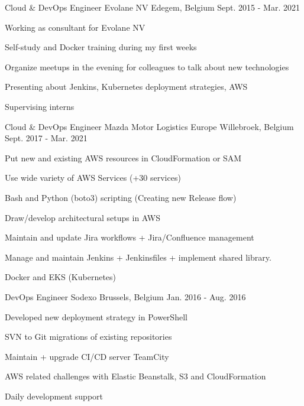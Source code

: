 \begin{cventries}
  \cventry
    {Cloud \& DevOps Engineer} %
    {Evolane NV} %
    {Edegem, Belgium} %
    {Sept. 2015 - Mar. 2021} %
    {
      \begin{cvitems} %
        \item {Working as consultant for Evolane NV}
        \item {Self-study and Docker training during my first weeks}
        \item {Organize meetups in the evening for colleagues to talk about new technologies}
        \item {Presenting about Jenkins, Kubernetes deployment strategies, AWS}
        \item {Supervising interns}
      \end{cvitems}
    }

  \cventry
    {Cloud \& DevOps Engineer} %
    {Mazda Motor Logistics Europe} %
    {Willebroek, Belgium} %
    {Sept. 2017 - Mar. 2021} %
    {
      \begin{cvitems} %
        \item {Put new and existing AWS resources in CloudFormation or SAM}
        \item {Use wide variety of AWS Services (+30 services)}
        \item {Bash and Python (boto3) scripting (Creating new Release flow)}
        \item {Draw/develop architectural setups in AWS}
        \item {Maintain and update Jira workflows + Jira/Confluence management}
        \item {Manage and maintain Jenkins + Jenkinsfiles + implement shared library.}
        \item {Docker and EKS (Kubernetes)}
      \end{cvitems}
    }

  \cventry
    {DevOps Engineer} %
    {Sodexo} %
    {Brussels, Belgium} %
    {Jan. 2016 - Aug. 2016} %
    {
      \begin{cvitems} %
        \item {Developed new deployment strategy in PowerShell}
        \item {SVN to Git migrations of existing repositories}
        \item {Maintain + upgrade CI/CD server TeamCity}
        \item {AWS related challenges with Elastic Beanstalk, S3 and CloudFormation}
        \item {Daily development support}
      \end{cvitems}
    }


\end{cventries}
